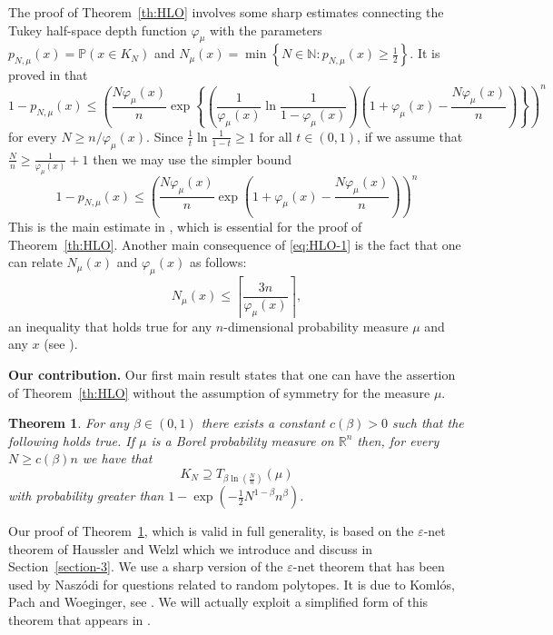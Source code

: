 \documentclass[11pt,leqno]{article}
\newtheorem{theorem}{Theorem}[section]
\theoremstyle{definition}
\theoremstyle{remark}
\numberwithin{equation}{section}
\newcommand{\ls}{\leqslant}
\newcommand{\gr}{\geqslant}
\renewcommand{\epsilon}{\varepsilon}
\newcommand{\1}{\textbf{1}}
\begin{document}
The proof of Theorem~\ref{th:HLO} involves some sharp estimates connecting the Tukey half-space depth function
$\varphi_{\mu}$ with the parameters $p_{N,\mu}(x)=\mathbb{P}(x\in K_N)$
and $N_{\mu}(x)=\min\left\{N\in\mathbb{N}:p_{N,\mu}(x)\gr\tfrac{1}{2}\right\}$.
It is proved in \cite[Proposition~13]{HLO-2023} that
\begin{equation}\label{eq:HLO-1}1-p_{N,\mu}(x)\ls\left(\frac{N\varphi_{\mu}(x)}{n}
\exp\left\{\left(\frac{1}{\varphi_{\mu}(x)}\ln\frac{1}{1-\varphi_{\mu}(x)}\right)
\left(1+\varphi_{\mu}(x)-\frac{N\varphi_{\mu}(x)}{n}\right)\right\}\right)^n\end{equation}
for every $N\gr n/\varphi_{\mu}(x)$. Since $\frac{1}{t}\ln\frac{1}{1-t}\gr 1$ for all $t\in (0,1)$,
if we assume that $\frac{N}{n}\gr \frac{1}{\varphi_{\mu}(x)}+1$ then we may use the simpler bound
\begin{equation}\label{eq:HLO-2}1-p_{N,\mu}(x)\ls\left(\frac{N\varphi_{\mu}(x)}{n}
\exp\left(1+\varphi_{\mu}(x)-\frac{N\varphi_{\mu}(x)}{n}\right)\right)^n\end{equation}
This is the main estimate in \cite{HLO-2023}, which is essential for the proof of Theorem~\ref{th:HLO}.
Another main consequence of \eqref{eq:HLO-1} is the fact that one can relate $N_{\mu}(x)$ and $\varphi_{\mu}(x)$
as follows:
\begin{equation}\label{eq:HLO-3}N_{\mu}(x)\ls\left\lceil\frac{3n}{\varphi_{\mu}(x)}\right\rceil, \end{equation}
an inequality that holds true for any $n$-dimensional probability measure $\mu$ and any $x$ (see \cite[Theorem~16]{HLO-2023}).

\smallskip


\textbf{Our contribution.} Our first main result states that one can have the assertion of
Theorem~\ref{th:HLO} without the assumption of symmetry for the measure $\mu$.

\begin{theorem}\label{th:deterministic}For any $\beta\in (0,1)$ there exists a constant $c(\beta)>0$ such that
the following holds true. If $\mu $ is a Borel probability measure on ${\mathbb R}^n$ then, for every $N\gr c(\beta)n$ we have that
$$K_N\supseteq T_{\beta\ln(\frac{N}{n})}(\mu)$$
with probability greater than $1-\exp(-\tfrac{1}{2}N^{1-\beta}n^{\beta})$.
\end{theorem}

Our proof of Theorem~\ref{th:deterministic}, which is valid in full generality, is based on the
$\varepsilon$-net theorem of Haussler and Welzl \cite{Haussler-Welzl} which we introduce and discuss
in Section~\ref{section-3}. We use a sharp version of the $\epsilon$-net theorem that has been used by
Nasz\'{o}di for questions related to random polytopes. It is due to Koml\'{o}s, Pach
and Woeginger, see \cite[Theorem~3.2]{Komlos-Pach-Woeginger}. We will actually exploit a
simplified form of this theorem that appears in \cite[Lemma~3.2]{Naszodi}.
\end{document}

